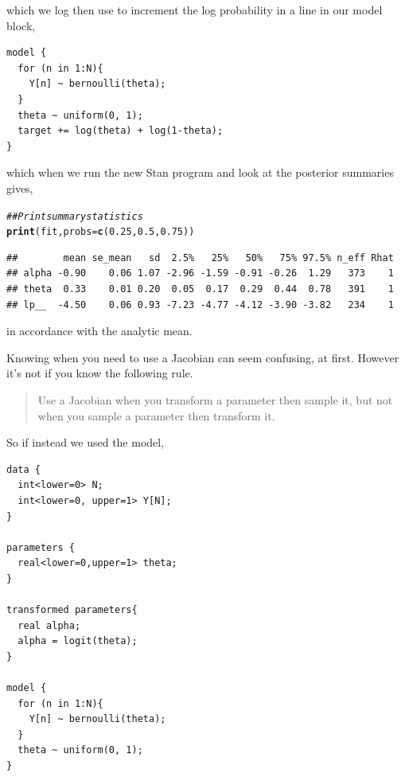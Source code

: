 \documentclass[11pt,fullpage]{book}
\makeatletter
\newenvironment{kframe}{%
	\def\at@end@of@kframe{}%
	\ifinner\ifhmode%
	\def\at@end@of@kframe{\end{minipage}}%
\begin{minipage}{\columnwidth}%
	\fi\fi%
	\def\FrameCommand##1{\hskip\@totalleftmargin \hskip-\fboxsep
		\colorbox{shadecolor}{##1}\hskip-\fboxsep
		\hskip-\linewidth \hskip-\@totalleftmargin \hskip\columnwidth}%
	\MakeFramed {\advance\hsize-\width
		\@totalleftmargin\z@ \linewidth\hsize
		\@setminipage}}%
{\par\unskip\endMakeFramed%
	\at@end@of@kframe}
\newcommand{\hlnum}[1]{\textcolor[rgb]{0.686,0.059,0.569}{#1}}%
\newcommand{\hlcom}[1]{\textcolor[rgb]{0.678,0.584,0.686}{\textit{#1}}}%
\newcommand{\hlstd}[1]{\textcolor[rgb]{0.345,0.345,0.345}{#1}}%
\newcommand{\hlkwc}[1]{\textcolor[rgb]{0.333,0.667,0.333}{#1}}%
\newcommand{\hlkwd}[1]{\textcolor[rgb]{0.737,0.353,0.396}{\textbf{#1}}}%
\newenvironment{knitrout}{}{} %
\makeatother
\begin{document}
which we log then use to increment the log probability in a line in our model block,

\begin{verbatim}
model { 
  for (n in 1:N){
    Y[n] ~ bernoulli(theta); 
  }
  theta ~ uniform(0, 1);  
  target += log(theta) + log(1-theta);
} 
\end{verbatim}

which when we run the new Stan program and look at the posterior summaries gives,

\begin{knitrout}\small
		\color{fgcolor}\begin{kframe}
			\begin{alltt}
				\hlcom{## Print summary statistics}
				\hlkwd{print}\hlstd{(fit,}\hlkwc{probs} \hlstd{=} \hlkwd{c}\hlstd{(}\hlnum{0.25}\hlstd{,} \hlnum{0.5}\hlstd{,} \hlnum{0.75}\hlstd{))}
			\end{alltt}
			\begin{verbatim}
##        mean se_mean   sd  2.5%   25%   50%   75% 97.5% n_eff Rhat
## alpha -0.90    0.06 1.07 -2.96 -1.59 -0.91 -0.26  1.29   373    1
## theta  0.33    0.01 0.20  0.05  0.17  0.29  0.44  0.78   391    1
## lp__  -4.50    0.06 0.93 -7.23 -4.77 -4.12 -3.90 -3.82   234    1
			\end{verbatim}
		\end{kframe}
	\end{knitrout}

in accordance with the analytic mean.

Knowing when you need to use a Jacobian can seem confusing, at first. However it's not if you know the following rule. 

\begin{quote}
Use a Jacobian when you transform a parameter then sample it, but not when you sample a parameter then transform it.
\end{quote}

So if instead we used the model,

\begin{verbatim}
data { 
  int<lower=0> N; 
  int<lower=0, upper=1> Y[N]; 
} 

parameters { 
  real<lower=0,upper=1> theta; 
} 

transformed parameters{
  real alpha;
  alpha = logit(theta);
}

model { 
  for (n in 1:N){
    Y[n] ~ bernoulli(theta); 
  }
  theta ~ uniform(0, 1);  
} 
\end{verbatim}
\end{document}
